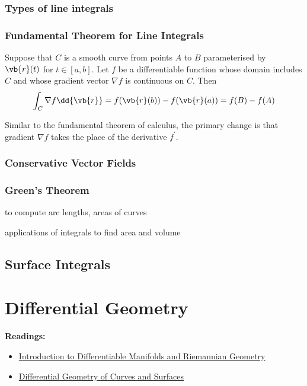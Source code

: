 \section{Types of line integrals}

\section{Fundamental Theorem for Line Integrals}
\begin{theorem}
Suppose that $C$ is a smooth curve from points $A$ to $B$ parameterised by $\vb{r}(t)$ for $t\in[a,b]$. Let $f$ be a differentiable function whose domain includes $C$ and whose gradient vector $\nabla f$ is continuous on $C$. Then
\begin{equation}
\int_C \nabla f \dd{\vb{r}} = f(\vb{r}(b)) - f(\vb{r}(a)) = f(B) - f(A)
\end{equation}
\end{theorem}

\begin{remark}
Similar to the fundamental theorem of calculus, the primary change is that gradient $\nabla f$ takes the place of the derivative $f^\prime$.
\end{remark}

\section{Conservative Vector Fields}

\section{Green's Theorem}


to compute arc lengths, areas of curves 

applications of integrals to find area and volume

\chapter{Surface Integrals}


\part{Differential Geometry}
\textbf{Readings:}
\begin{itemize}
\item \href{https://aetemad.iut.ac.ir/sites/aetemad.iut.ac.ir/files/files_course/william_m._boothby_an_introduction_to_differentibookfi.org_.pdf}{Introduction to Differentiable Manifolds and Riemannian Geometry}
\item \href{http://www2.ing.unipi.it/griff/files/dC.pdf}{Differential Geometry of Curves and Surfaces}
\end{itemize}